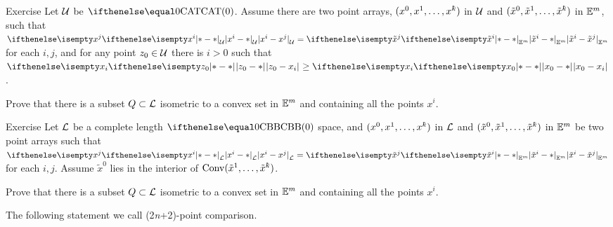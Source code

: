 \begin{thm}{Exercise}\label{ex:flat-in-CAT}
Let $\mathcal{U}$ be $\CAT0$. 
Assume there are two point arrays, $(x^0,x^1,\dots,x^\kay)$ in $\mathcal{U}$ and $(\tilde x^0,\tilde x^1,\dots,\tilde x^\kay)$ in $\mathbb{E}^m$, such that 
$\dist{x^i}{x^j}{\spc{U}}=\dist{\tilde x^i}{\tilde x^j}{\EE^m}$ for each $i,j$, and 
for any point $z_0\in\spc{U}$ there is $i>0$ such that $\dist{z_0}{x_i}{}\ge\dist{x_0}{x_i}{}$.

Prove that there is a subset $Q\subset\spc{L}$ isometric to a convex set in $\mathbb{E}^m$ and containing all the points $x^i$.
\end{thm}

\begin{thm}{Exercise}\label{ex:flat-in-CBB}
Let $\mathcal{L}$ be a complete length $\Alex{0}$ space, and
$(x^0,x^1,\dots,x^\kay)$ in $\mathcal{L}$ and $(\tilde x^0,\tilde x^1,\dots,\tilde x^\kay)$ in $\mathbb{E}^m$
be two point arrays such that 
$\dist{x^i}{x^j}{\spc{L}}=\dist{\tilde x^i}{\tilde x^j}{\EE^m}$ for each $i,j$.
Assume 
$\tilde x^0$ lies in the interior of $\Conv(\tilde x^1,\dots,\tilde x^\kay)$.

Prove that there is a subset $Q\subset\spc{L}$ isometric to a convex set in $\mathbb{E}^m$ and containing all the points $x^i$.
\end{thm}


The following statement we call (2\textit{n}+2)-point comparison.

